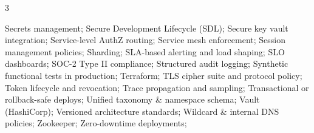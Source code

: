 \documentclass[letterpaper,11pt]{article}
\begin{document}
\begin{multicols}{3}
{\begin{itemize}[leftmargin=0.1in, label={}, itemsep=0pt, parsep=0pt, topsep=0pt, partopsep=0pt]
                Secrets management;
                Secure Development Lifecycle (SDL);
                Secure key vault integration;
                Service-level AuthZ routing;
                Service mesh enforcement;
                Session management policies;
                Sharding;
                SLA-based alerting and load shaping;
                SLO dashboards;
                SOC-2 Type II compliance;
                Structured audit logging;
                Synthetic functional tests in production;
                Terraform;
                TLS cipher suite and protocol policy;
                Token lifecycle and revocation;
                Trace propagation and sampling;
                Transactional or rollback-safe deploys;
                Unified taxonomy \& namespace schema;
                Vault (HashiCorp);
                Versioned architecture standards;
                Wildcard \& internal DNS policies;
                Zookeeper;
                Zero-downtime deployments;


\end{itemize}}
\end{multicols}
\end{document}
